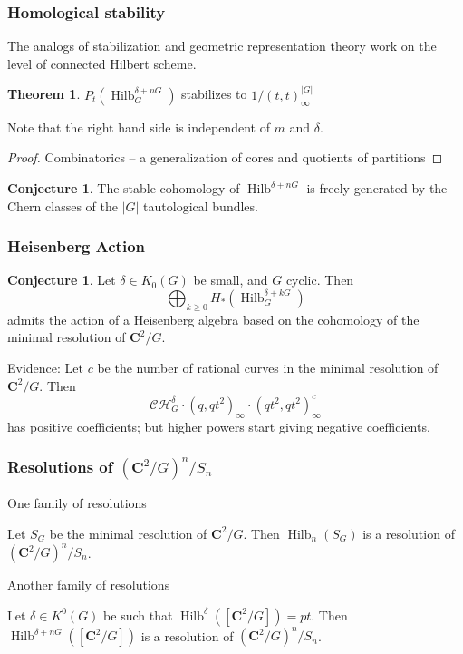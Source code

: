 \documentclass{amsart}[12pt]
\theoremstyle{definition}
\newtheorem{theorem}[dummy]{Theorem}
\newtheorem{conjecture}[dummy]{Conjecture}
\newcommand{\C}{\mathbf{C}}
\DeclareMathOperator{\Hilb}{Hilb}
\begin{document}
\subsubsection{Homological stability}

The analogs of stabilization and geometric representation theory work on the level of connected Hilbert scheme.

\begin{theorem} 
$P_t(\Hilb^{\delta+nG}_G)$ stabilizes to $1/(t,t)_\infty^{|G|}$
\end{theorem}
Note that the right hand side is independent of $m$ and $\delta$.
\begin{proof} Combinatorics -- a generalization of cores and quotients of partitions \end{proof}

\begin{conjecture}
The stable cohomology of $\Hilb^{\delta+nG}$ is freely generated by the Chern classes of the $|G|$ tautological bundles.
\end{conjecture}



\subsubsection{Heisenberg Action}


\begin{conjecture}
Let $\delta\in K_0(G)$ be small, and $G$ cyclic.  Then
$$\bigoplus_{k\geq 0} H_*(\Hilb^{\delta+kG}_G)$$ admits the action of a Heisenberg algebra based on the cohomology of the minimal resolution of $\C^2/G$.
\end{conjecture}

Evidence:
Let $c$ be the number of rational curves in the minimal resolution of $\C^2/G$.  Then
$$\mathcal{CH}^\delta_G\cdot(q,qt^2)_\infty\cdot (qt^2,qt^2)_\infty^c$$
has positive coefficients; but higher powers start giving negative coefficients.


\subsubsection{Resolutions of $(\C^2/G)^n/S_n$}
One family of resolutions

Let $S_G$ be the minimal resolution of $\C^2/G$.  Then $\Hilb_n(S_G)$ is a resolution of $(\C^2/G)^n/S_n$.


Another family of resolutions

Let $\delta\in K^0(G)$ be such that $\Hilb^\delta([\C^2/G])=pt$.  Then $\Hilb^{\delta+nG}([\C^2/G])$ is a resolution of $(\C^2/G)^n/S_n$.  
\end{document}
